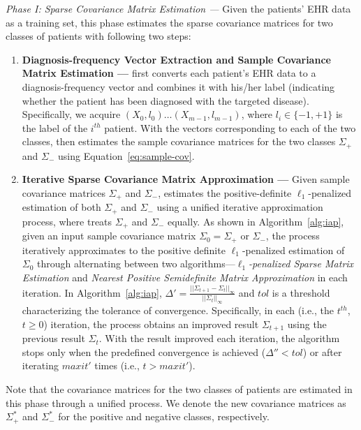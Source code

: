 \emph{Phase I: Sparse Covariance Matrix Estimation --- } Given the patients' EHR data as a training set, this phase estimates the sparse covariance matrices for two classes of patients with following two steps:
\begin{enumerate}

    \item \textbf{Diagnosis-frequency Vector Extraction and Sample Covariance Matrix Estimation --- } \TheName{} first converts each patient's EHR data to a diagnosis-frequency vector and combines it with his/her label (indicating whether the patient has been diagnosed with the targeted disease).
Specifically, we acquire $(X_0,l_0)\dots (X_{m-1},l_{m-1})$, where $l_i\in\{-1,+1\}$ is the label of the $i^{th}$ patient.
With the vectors corresponding to each of the two classes, \TheName{} then estimates the sample covariance matrices for the two classes $\Sigma_+$ and $\Sigma_-$ using Equation~\ref{eq:sample-cov}.  


    \item \textbf{Iterative Sparse Covariance Matrix Approximation --- } Given sample covariance matrices $\Sigma_+$ and $\Sigma_-$, \TheName{} estimates the positive-definite $\ell_1$-penalized estimation of both $\Sigma_+$ and $\Sigma_-$ using a unified iterative approximation process, where \TheName{} treats $\Sigma_+$ and $\Sigma_-$ equally.
     As shown in Algorithm~\ref{alg:iap}, given an input sample covariance matrix $\Sigma_0=\Sigma_+$ or $\Sigma_-$, the process iteratively approximates to the positive definite $\ell_1$-penalized estimation of $\Sigma_0$ through alternating between two algorithms---\emph{$\ell_1$-penalized Sparse Matrix Estimation} and \emph{Nearest Positive Semidefinite Matrix Approximation} in each iteration.
In Algorithm~\ref{alg:iap}, $\Delta'=\frac{||\Sigma_{t+1}-\Sigma_{t}||_\infty}{||\Sigma_{t}||_\infty}$ and $tol$ is a threshold characterizing the tolerance of convergence.
     Specifically, in each (i.e., the $t^{th}$, $t\geq 0$) iteration, the process obtains an improved result $\Sigma_{t+1}$ using the previous result $\Sigma_{t}$.
     With the result improved each iteration, the algorithm stops only when the predefined convergence is achieved ($\Delta''< tol$) or after iterating $maxit'$ times (i.e., $t>maxit'$).
 

\end{enumerate}
Note that the covariance matrices for the two classes of patients are estimated in this phase through a unified process.
We denote the new covariance matrices as $\Sigma_+^*$ and $\Sigma_-^*$ for the positive and negative classes, respectively.

